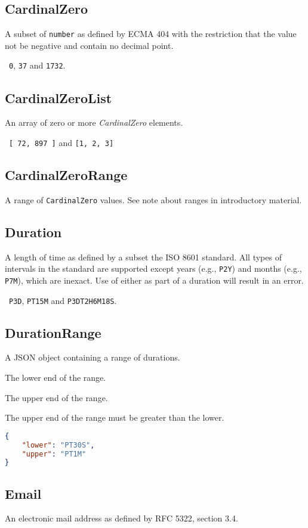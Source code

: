 \documentclass[10pt]{article}
\begin{document}
\subsection{CardinalZero}
A subset of {\tt number} as defined by ECMA 404 with the restriction
that the value not be negative and contain no decimal point.

\example\ {\tt 0}, {\tt 37} and {\tt 1732}.


\subsection{CardinalZeroList}
An array of zero or more {\it CardinalZero} elements.

\example\ {\tt [ 72, 897 ]} and {\tt [1, 2, 3]}


\subsection{CardinalZeroRange}
A range of {\tt CardinalZero} values.  See note about ranges in
introductory material.



\subsection{Duration}
A length of time as defined by a subset the ISO 8601 standard.  All
types of intervals in the standard are supported except years (e.g.,
{\tt P2Y}) and months (e.g., {\tt P7M}), which are inexact.  Use of
either as part of a duration will result in an error.

\example\ {\tt P3D}, {\tt PT15M} and {\tt P3DT2H6M18S}.


\subsection{DurationRange}
A JSON object containing a range of durations.

 The lower end of the range.

 The upper end of the range.

The upper end of the range must be greater than the lower.


\example
\begin{lstlisting}[language=json]
{
    "lower": "PT30S",
    "upper": "PT1M"
}
\end{lstlisting}



\subsection{Email}
An electronic mail address as defined by RFC 5322, section 3.4.
\end{document}
